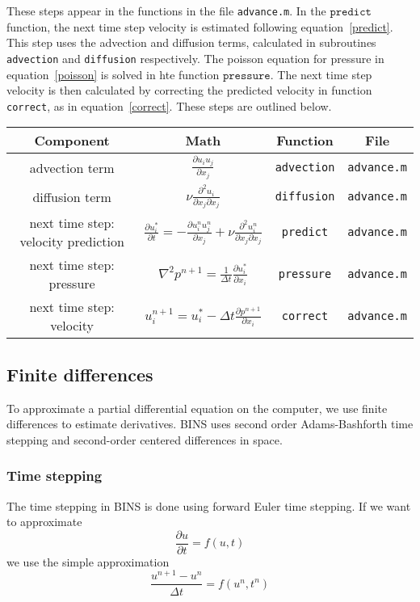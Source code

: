 \documentclass[12pt]{article}
\begin{document}
These steps appear in the functions in the file \texttt{advance.m}.  In the $\texttt{predict}$ function, the next time step velocity is estimated following equation~\ref{predict}.  This step uses the advection and diffusion terms, calculated in subroutines \texttt{advection} and \texttt{diffusion} respectively.  The poisson equation for pressure in equation~\ref{poisson} is solved in hte function $\texttt{pressure}$.  The next time step velocity is then calculated by correcting the predicted velocity in function \texttt{correct}, as in equation~\ref{correct}.  These steps are outlined below.

\begin{center}
\begin{tabular}{|c|c|c|c|}
\hline 
\bf{Component} & \bf{Math} & \bf{Function} & \bf{File}\\ 
\hline 
advection term & $\frac{\partial u_i u_j}{\partial x_j}$ & \texttt{advection} & \texttt{advance.m}\\ 
\hline 
diffusion term & $\nu \frac{\partial^2 u_i}{\partial x_j \partial x_j}$ & \texttt{diffusion} & \texttt{advance.m} \\ 
\hline 
next time step: velocity prediction & $ \frac{\partial u_i^*}{\partial t} =   -\frac{\partial u_i^n u_j^n}{\partial x_j} + \nu \frac{\partial^2 u_i^n}{\partial x_j \partial x_j} $ & \texttt{predict}& \texttt{advance.m} \\ 
\hline 
next time step: pressure & $\nabla^2 p^{n+1} = \frac{1}{\Delta t}\frac{\partial u_i^*}{\partial x_i}$ & \texttt{pressure} & \texttt{advance.m}\\ 
\hline 
next time step: velocity & $u_i^{n+1}= u_i^* - \Delta t\frac{\partial p^{n+1}}{\partial x_i}$ & \texttt{correct}& \texttt{advance.m} \\ 
\hline 
\end{tabular} 
\end{center}

\subsection{Finite differences}

To approximate a partial differential equation on the computer, we use finite differences to estimate derivatives.  BINS uses second order Adams-Bashforth time stepping and second-order centered differences in space.

\subsubsection{Time stepping}
The time stepping in BINS is done using forward Euler time stepping.  If we want to approximate 
\[ \frac{\partial u}{\partial t} = f(u,t) \]
we use the simple approximation
\[ \frac{u^{n+1}-u^n}{\Delta t} = f(u^n,t^n)\]
\end{document}
